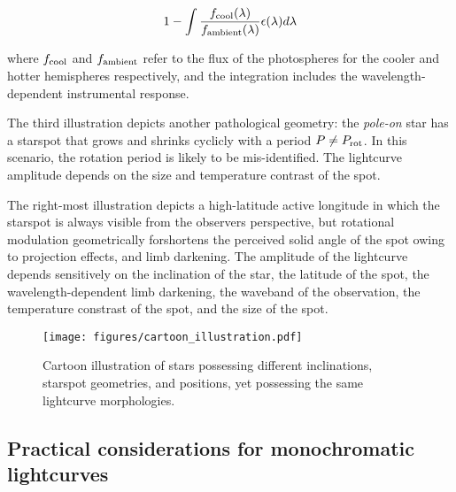 \documentclass[twocolumn]{emulateapj}%
\begin{document}
\begin{equation}
1- \int \frac{f_{\rm cool}(\lambda)}{f_{\rm ambient}(\lambda)} \epsilon(\lambda) d\lambda
\end{equation}

where $f_{\rm cool}$ and $f_{\rm ambient}$ refer to the flux of the photospheres for the cooler and hotter hemispheres respectively, and the integration includes the wavelength-dependent instrumental response.

The third illustration depicts another pathological geometry: the \emph{pole-on} star has a starspot that grows and shrinks cyclicly with a period $P \neq P_{\rm rot}$.  In this scenario, the rotation period is likely to be mis-identified.  The lightcurve amplitude depends on the size and temperature contrast of the spot.

The right-most illustration depicts a high-latitude active longitude in which the starspot is always visible from the observers perspective, but rotational modulation geometrically forshortens the perceived solid angle of the spot owing to projection effects, and limb darkening.  The amplitude of the lightcurve depends sensitively on the inclination of the star, the latitude of the spot, the wavelength-dependent limb darkening, the waveband of the observation, the temperature constrast of the spot, and the size of the spot.


\begin{figure*}
 \centering
 \texttt{[image: figures/cartoon\_illustration.pdf]}
 \caption{Cartoon illustration of stars possessing different inclinations, starspot geometries, and positions, yet possessing the same lightcurve morphologies.}
 \label{fig:cartoon}
\end{figure*}

\subsection{Practical considerations for monochromatic lightcurves}
\end{document}
